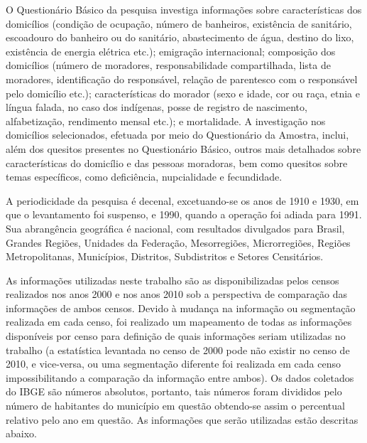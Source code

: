 O Questionário Básico da pesquisa investiga informações sobre características dos domicílios (condição de ocupação, número de banheiros, existência de sanitário, escoadouro do banheiro ou do sanitário, abastecimento de água, destino do lixo, existência de energia elétrica etc.); emigração internacional; composição dos domicílios (número de moradores, responsabilidade compartilhada, lista de moradores, identificação do responsável, relação de parentesco com o responsável pelo domicílio etc.); características do morador (sexo e idade, cor ou raça, etnia e língua falada, no caso dos indígenas, posse de registro de nascimento, alfabetização, rendimento mensal etc.); e mortalidade. A investigação nos domicílios selecionados, efetuada por meio do Questionário da Amostra, inclui, além dos quesitos presentes no Questionário Básico, outros mais detalhados sobre características do domicílio e das pessoas moradoras, bem como quesitos sobre temas específicos, como deficiência, nupcialidade e fecundidade.

A periodicidade da pesquisa é decenal, excetuando-se os anos de 1910 e 1930, em que o levantamento foi suspenso, e 1990, quando a operação foi adiada para 1991. Sua abrangência geográfica é nacional, com resultados divulgados para Brasil, Grandes Regiões, Unidades da Federação, Mesorregiões, Microrregiões, Regiões Metropolitanas, Municípios, Distritos, Subdistritos e Setores Censitários.

As informações utilizadas neste trabalho são as disponibilizadas pelos censos realizados nos anos 2000 e nos anos 2010 sob a perspectiva de comparação das informações de ambos censos. Devido à mudança na informação ou segmentação realizada em cada censo, foi realizado um mapeamento de todas as informações disponíveis por censo para definição de quais informações seriam utilizadas no trabalho (a estatística levantada no censo de 2000 pode não existir no censo de 2010, e vice-versa, ou uma segmentação diferente foi realizada em cada censo impossibilitando a comparação da informação entre ambos). Os dados coletados do IBGE são números absolutos, portanto, tais números foram divididos pelo número de habitantes do município em questão obtendo-se assim o percentual relativo pelo ano em questão. As informações que serão utilizadas estão descritas abaixo.

